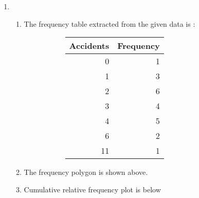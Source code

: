 \begin{enumerate}
	\item \begin{enumerate}
		\item The frequency table extracted from the given data is :
		\begin{figure}[H]
			\begin{subfigure}[]{0.45\linewidth}
				\centering
				\begin{table}[H]
					
					\begin{tabular}{@{}rr@{}}
						\toprule
						Accidents & Frequency \\ \midrule
						0         & 1         \\
						1         & 3         \\
						2         & 6         \\
						3         & 4         \\
						4         & 5         \\
						6         & 2         \\
						11        & 1         \\ \bottomrule
					\end{tabular}
				\end{table}
			\end{subfigure}
			\begin{subfigure}[]{0.45\linewidth}
				\centering
			\end{subfigure}
			
		\end{figure}
		
		\item The frequency polygon is shown above.
		
		\item Cumulative relative frequency plot is below \\
		
		\begin{figure}[H]
			\centering
		\end{figure}
		

\end{enumerate}
\end{enumerate}
